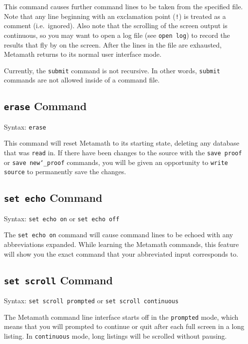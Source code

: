 This command causes further command lines to be taken from the specified
file.  Note that any line beginning with an exclamation point (\texttt{!}) is
treated as a comment (i.e.\ ignored).  Also note that the scrolling
of the screen output is continuous, so you may want to open a log file
(see \texttt{open log}) to record the results that fly by on the screen.
After the lines in the file are exhausted, Metamath returns to its
normal user interface mode.

Currently, the \texttt{submit} command is not recursive.  In other words,
\texttt{submit} commands are not allowed inside of a command file.


\subsection{\texttt{erase} Command}
Syntax:  \texttt{erase}

This command will reset Metamath to its starting state, deleting any
data\-base that was \texttt{read} in.
 If there have been changes to the
source with the \texttt{save proof} or \texttt{save new{\char`\_}proof}
commands, you will be given an opportunity to \texttt{write source} to
permanently save the changes.



\subsection{\texttt{set echo} Command}
Syntax:  \texttt{set echo on} or \texttt{set echo off}

The \texttt{set echo on} command will cause command lines to be echoed with any
abbreviations expanded.  While learning the Metamath commands, this
feature will show you the exact command that your abbreviated input
corresponds to.



\subsection{\texttt{set scroll} Command}
Syntax:  \texttt{set scroll prompted} or \texttt{set scroll continuous}

The Metamath command line interface starts off in the \texttt{prompted} mode,
which means that you will prompted to continue or quit after each
full screen in a long listing.  In \texttt{continuous} mode, long listings will be
scrolled without pausing.

